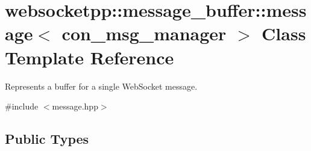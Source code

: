 \hypertarget{classwebsocketpp_1_1message__buffer_1_1message}{}\section{websocketpp\+:\+:message\+\_\+buffer\+:\+:message$<$ con\+\_\+msg\+\_\+manager $>$ Class Template Reference}
\label{classwebsocketpp_1_1message__buffer_1_1message}


Represents a buffer for a single Web\+Socket message.  




{\ttfamily \#include $<$message.\+hpp$>$}

\subsection*{Public Types}
